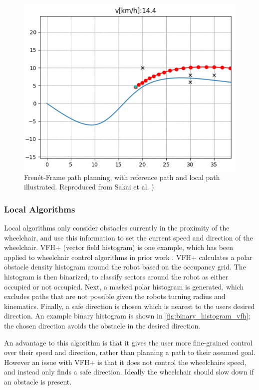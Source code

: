 \documentclass[12pt]{article}
\begin{document}
\begin{figure}[H]
    \centering
    \includegraphics[width=0.5\linewidth]{images/frenet_frame_local_path.png}
    \caption{Fren\'et-Frame path planning, with reference path and local path illustrated. Reproduced from Sakai et al. \cite{sakaiPythonRoboticsPythonCode2018})}
    \label{fig:frenet_frame_local_path}
\end{figure}

\subsubsection{Local Algorithms}
Local algorithms only consider obstacles currently in the proximity of the wheelchair,
and use this information to set the current speed and direction of the wheelchair.
VFH+ (vector field histogram) \cite{ulrichVFHReliableObstacle1998} is one example, which
has been applied to wheelchair control algorithms in prior work \cite{tomariEnhancingWheelchairControl2014}.
VFH+ calculates a polar obstacle density histogram around the robot based on the occupancy grid.
The histogram is then binarized, to classify sectors around the robot as either occupied or not occupied.
Next, a masked polar histogram is generated, which excludes paths that are not possible given the robots
turning radius and kinematics. Finally, a safe direction is chosen which is nearest to the users desired direction.
An example binary histogram is shown in \cref{fig:binary_histogram_vfh}; the chosen direction avoids the obstacle in the
desired direction.

An advantage to this algorithm is that it gives the user more fine-grained control over their speed and direction,
rather than planning a path to their assumed goal.
However an issue with VFH+ is that it does not control the wheelchairs speed, and instead only finds a safe direction.
Ideally the wheelchair should slow down if an obstacle is present.
\end{document}
